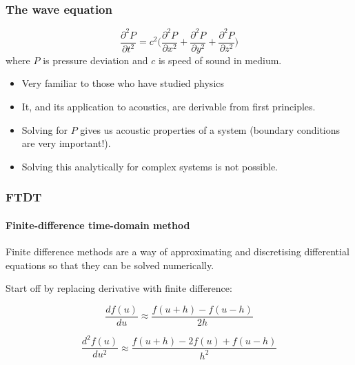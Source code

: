 \documentclass{beamer}
\begin{document}
  
\begin{frame}
	\frametitle{The wave equation}
	$$		\frac{{\partial ^2 P}}{{\partial t^2 }} = c^2 \Bigg( \frac{\partial ^2 P}{\partial x^2 } + \frac{\partial ^2 P}{\partial y^2 }  + \frac{\partial ^2 P}{\partial z^2 } \Bigg)$$
	where $P$ is pressure deviation and $c$ is speed of sound in medium.
	\linebreak
	\begin{itemize}
		\item Very familiar to those who have studied physics
		\item It, and its application to acoustics, are derivable from first principles.
		\item Solving for $P$ gives us acoustic properties of a system (boundary conditions are very important!).
		\item Solving this analytically for complex systems is not possible.
	\end{itemize}    
\end{frame}

\begin{frame}
	\frametitle{FTDT}
	\framesubtitle{Finite-difference time-domain method}
	Finite difference methods are a way of approximating and discretising differential equations so that they can be solved numerically.
	\linebreak
	
	Start off by replacing derivative with finite difference:
	
	
	
	\begin{equation}
		\label{equation:difference}
		\frac{df(u)}{du} \approx \frac{f(u+h) - f(u-h)}{2h}
	\end{equation}
	
	\begin{equation}
		\label{equation:difference-second}
		\frac{d^{2}f(u)}{du^{2}} \approx \frac{f(u+h) - 2f(u) + f(u-h)}{h^{2}}
	\end{equation}
\end{frame}
\end{document}
